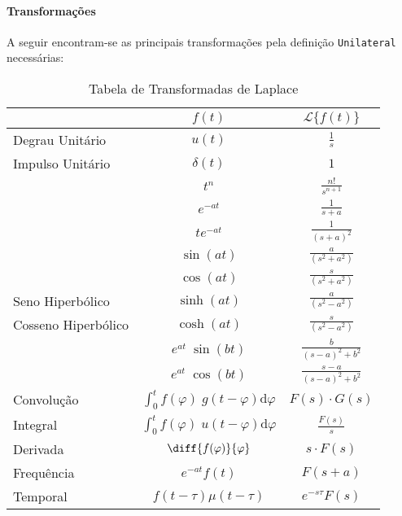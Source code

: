 \documentclass{article}
\begin{document}
            \paragraph{Transformações}A seguir encontram-se as principais transformações pela definição \texttt{Unilateral} necessárias:
                \begin{table}[H]
                    \centering
                    \begingroup
                    \renewcommand{\arraystretch}{1.25}
                    \begin{tabular}[]{lcc}
                                         & $f(t)$      & $\mathcal{L}\{ f(t) \}$\\\hline
                        Degrau Unitário  & $u(t)$      & $\frac{1}{s}$\\
                        Impulso Unitário & $\delta(t)$ & $1$\\
                                         & $t^{n}$     & $\frac{n!}{s^{n+1}}$\\
                                         & $e^{-at}$   & $\frac{1}{s+a}$\\
                                         & $te^{-at}$  & $\frac{1}{(s+a)^{2}}$\\
                                         & $\sin(at)$  & $\frac{a}{(s^2+a^2)}$\\
                                         & $\cos(at)$  & $\frac{s}{(s^2+a^2)}$\\
                        Seno Hiperbólico    & $\sinh(at)$  & $\frac{a}{(s^2-a^2)}$\\
                        Cosseno Hiperbólico & $\cosh(at)$  & $\frac{s}{(s^2-a^2)}$\\
                                         & $e^{at}\;\sin(bt)$  & $\frac{b}{(s-a)^2+b^2}$\\
                                         & $e^{at}\;\cos(bt)$  & $\frac{s-a}{(s-a)^2+b^2}$\\
                        Convolução       & $\int_{0}^{t} f(\varphi)\;g(t - \varphi) \text{d}\varphi$ & $F(s)\cdot G(s)$\\
                        Integral         & $\int_{0}^{t} f(\varphi)\;u(t - \varphi) \text{d}\varphi$ & $\frac{F(s)}{s}$\\
                        Derivada         & $\diff{f(\varphi)}{\varphi}$ & $s\cdot F(s)$\\
                        Frequência       & $e^{-at}f(t)$          & $F(s+a)$\\
                        Temporal         & $f(t-\tau)\mu(t-\tau)$ & $e^{-s\tau}F(s)$\\\hline
                    \end{tabular}
                    \endgroup
                    \caption{Tabela de Transformadas de Laplace}\label{table:Laplace}
                \end{table} \noindent
\end{document}
